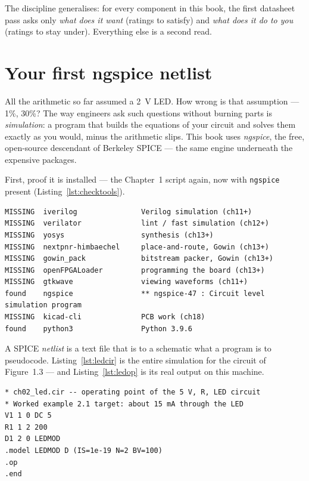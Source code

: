 The discipline generalises: for every component in this book, the first
datasheet pass asks only \emph{what does it want} (ratings to satisfy) and
\emph{what does it do to you} (ratings to stay under). Everything else is a
second read.

\section{Your first ngspice netlist}
\label{sec:ngspice}

All the arithmetic so far assumed a \qty{2}{\volt} LED. How wrong is that
assumption — 1\%, 30\%? The way engineers ask such questions without burning
parts is \emph{simulation}: a program that builds the
equations of your circuit and solves them exactly as you would, minus the
arithmetic slips. This book uses \emph{ngspice}, the free,
open-source descendant of Berkeley SPICE — the same engine underneath the
expensive packages.

First, proof it is installed — the Chapter~1 script again, now with
\texttt{ngspice} present (Listing~\ref{lst:checktools}).

\begin{lstlisting}[language={},numbers=none,caption={Real output of
\texttt{sh code/check\_tools.sh} on this machine after \texttt{brew install
ngspice}: the line that matters reads \emph{found}. (The script's version
grab was also fixed: ngspice prints a decorative banner first, so it now
reports the first line containing a digit.)},label={lst:checktools02}]
MISSING  iverilog               Verilog simulation (ch11+)
MISSING  verilator              lint / fast simulation (ch12+)
MISSING  yosys                  synthesis (ch13+)
MISSING  nextpnr-himbaechel     place-and-route, Gowin (ch13+)
MISSING  gowin_pack             bitstream packer, Gowin (ch13+)
MISSING  openFPGALoader         programming the board (ch13+)
MISSING  gtkwave                viewing waveforms (ch11+)
found    ngspice                ** ngspice-47 : Circuit level simulation program
MISSING  kicad-cli              PCB work (ch18)
found    python3                Python 3.9.6
\end{lstlisting}

A SPICE \emph{netlist} is a text file that is to a schematic
what a program is to pseudocode. Listing~\ref{lst:ledcir} is the entire
simulation for the circuit of Figure~1.3 — and Listing~\ref{lst:ledop} is
its real output on this machine.

\begin{lstlisting}[language={},caption={\texttt{code/ch02\_led.cir} -- every
line earns its place: a comment, one source, one resistor, one diode, a
model, an analysis request, \texttt{.end}.},label={lst:ledcir}]
* ch02_led.cir -- operating point of the 5 V, R, LED circuit
* Worked example 2.1 target: about 15 mA through the LED
V1 1 0 DC 5
R1 1 2 200
D1 2 0 LEDMOD
.model LEDMOD D (IS=1e-19 N=2 BV=100)
.op
.end
\end{lstlisting}

